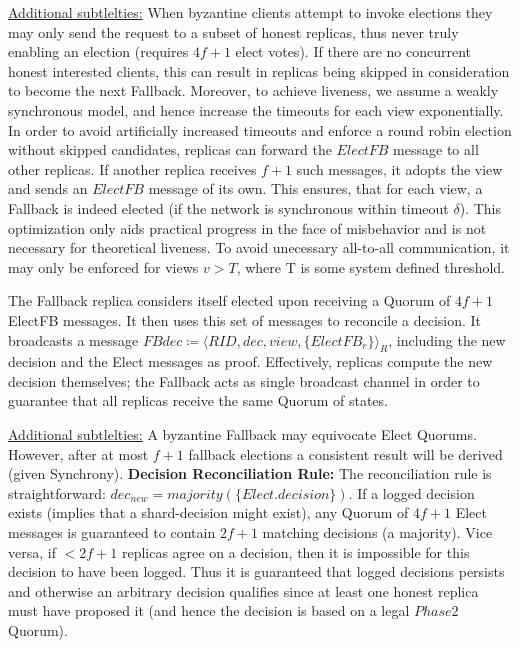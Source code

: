 \underline{Additional subtlelties:} 
When byzantine clients attempt to invoke elections they may only send the request to a subset of honest replicas, thus never truly enabling an election (requires $4f+1$ elect votes). If there are no concurrent honest interested clients, this can result in replicas being skipped in consideration to become the next Fallback. Moreover, to achieve liveness, we assume a weakly synchronous model, and hence increase the timeouts for each view exponentially.
In order to avoid artificially increased timeouts and enforce a round robin election without skipped candidates, replicas can forward the $ElectFB$ message to all other replicas. If another replica receives $f+1$ such messages, it adopts the view and sends an $ElectFB$ message of its own. This ensures, that for each view, a Fallback is indeed elected (if the network is synchronous within timeout $\delta$). This optimization only aids practical progress in the face of misbehavior and is not necessary for theoretical liveness. To avoid unecessary all-to-all communication, it may only be enforced for views $v > T$, where T is some system defined threshold.  



The Fallback replica considers itself elected upon receiving a Quorum of $4f+1$ ElectFB messages. It then uses this set of messages to reconcile a decision. It broadcasts a message $FBdec \coloneqq \langle RID, dec, view, \{ElectFB_r\} \rangle_R$, including the new decision and the Elect messages as proof. Effectively, replicas compute the new decision themselves; the Fallback acts as single broadcast channel in order to guarantee that all replicas receive the same Quorum of states.

\underline{Additional subtlelties:} A byzantine Fallback may equivocate Elect Quorums. However, after at most $f+1$ fallback elections a consistent result will be derived (given Synchrony).
\textbf{Decision Reconciliation Rule:} The reconciliation rule is straightforward: $dec_{new} = majority(\{Elect.decision\})$. If a logged decision exists (implies that a shard-decision might exist), any Quorum of $4f+1$ Elect messages is guaranteed to contain $2f+1$ matching decisions (a majority). Vice versa, if $<2f+1$ replicas agree on a decision, then it is impossible for this decision to have been logged. Thus it is guaranteed that logged decisions persists and otherwise an arbitrary decision qualifies since at least one honest replica must have proposed it (and hence the decision is based on a legal $Phase2$ Quorum).


